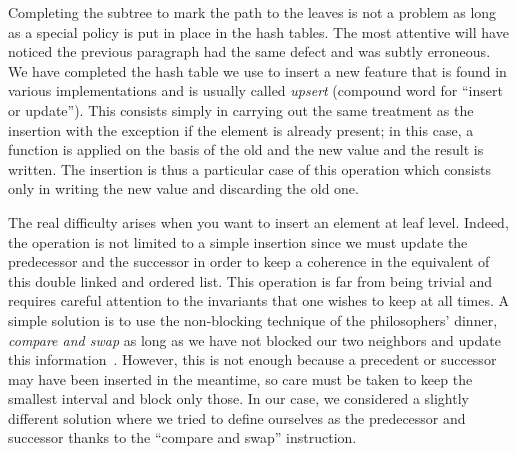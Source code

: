 Completing the subtree to mark the path to the leaves is not a problem as long as a special policy is put in place in the hash tables. The most attentive will have noticed the previous paragraph had the same defect and was subtly erroneous. We have completed the hash table we use to insert a new feature that is found in various implementations and is usually called \textit{upsert} (compound word for ``insert or update''). This consists simply in carrying out the same treatment as the insertion with the exception if the element is already present; in this case, a function is applied on the basis of the old and the new value and the result is written. The insertion is thus a particular case of this operation which consists only in writing the new value and discarding the old one.

The real difficulty arises when you want to insert an element at leaf level. Indeed, the operation is not limited to a simple insertion since we must update the predecessor and the successor in order to keep a coherence in the equivalent of this double linked and ordered list. This operation is far from being trivial and requires careful attention to the invariants that one wishes to keep at all times. A simple solution is to use the non-blocking technique of the philosophers' dinner, \textit{compare and swap} as long as we have not blocked our two neighbors and update this information~\cite{tanenbaum2009modern}. However, this is not enough because a precedent or successor may have been inserted in the meantime, so care must be taken to keep the smallest interval and block only those. In our case, we considered a slightly different solution where we tried to define ourselves as the predecessor and successor thanks to the ``compare and swap'' instruction.
